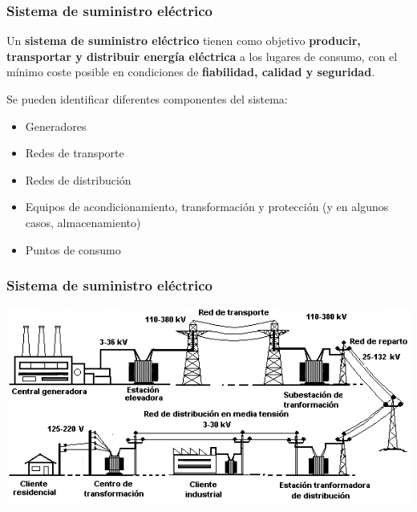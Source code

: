 \documentclass[serif, xcolor=dvipsnames]{beamer}
\begin{document}
\begin{frame}
  \frametitle{Sistema de suministro eléctrico}

  Un \textbf{sistema de suministro eléctrico} tienen como objetivo
  \textbf{producir, transportar y distribuir energía eléctrica} a los
  lugares de consumo, con el mínimo coste posible en condiciones de
  \textbf{fiabilidad, calidad y seguridad}.

  Se pueden identificar diferentes componentes del sistema:
  \begin{itemize}
  \item Generadores
  \item Redes de transporte
  \item Redes de distribución
  \item Equipos de acondicionamiento, transformación y protección (y
    en algunos casos, almacenamiento)
  \item Puntos de consumo
  \end{itemize}

\end{frame}
\begin{frame}
  \frametitle{Sistema de suministro eléctrico}

  \begin{center}
    \includegraphics[scale=0.5]{../figs/Redelectrica2}
    \par\end{center}


\end{frame}
\end{document}
